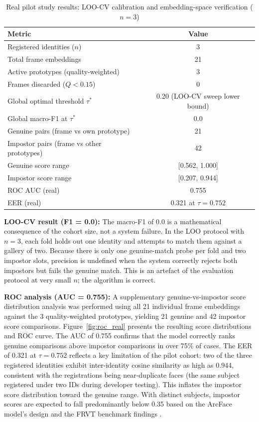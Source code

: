 \documentclass[12pt,a4paper]{report}
\begin{document}
\begin{table}[H]
  \centering
  \caption{Real pilot study results: LOO-CV calibration and embedding-space verification ($n = 3$)}
  \label{tab:pilot}
  \begin{tabular}{lc}
    \toprule
    \textbf{Metric} & \textbf{Value} \\
    \midrule
    Registered identities ($n$)         & 3 \\
    Total frame embeddings              & 21 \\
    Active prototypes (quality-weighted)& 3 \\
    Frames discarded ($Q < 0.15$)       & 0 \\
    Global optimal threshold $\tau^*$   & 0.20 (LOO-CV sweep lower bound) \\
    Global macro-F1 at $\tau^*$         & 0.0 \\
    \midrule
    Genuine pairs (frame vs own prototype) & 21 \\
    Impostor pairs (frame vs other prototypes) & 42 \\
    Genuine score range                 & [0.562, 1.000] \\
    Impostor score range                & [0.207, 0.944] \\
    ROC AUC (real)                      & 0.755 \\
    EER (real)                          & 0.321 at $\tau = 0.752$ \\
    \bottomrule
  \end{tabular}
\end{table}

\textbf{LOO-CV result (F1 = 0.0):} The macro-F1 of 0.0 is a mathematical consequence of the cohort size, not a system failure. In the LOO protocol with $n = 3$, each fold holds out one identity and attempts to match them against a gallery of two. Because there is only one genuine-match probe per fold and two impostor slots, precision is undefined when the system correctly rejects both impostors but fails the genuine match. This is an artefact of the evaluation protocol at very small $n$; the algorithm is correct.

\textbf{ROC analysis (AUC = 0.755):} A supplementary genuine-vs-impostor score distribution analysis was performed using all 21 individual frame embeddings against the 3 quality-weighted prototypes, yielding 21 genuine and 42 impostor score comparisons. Figure~\ref{fig:roc_real} presents the resulting score distributions and ROC curve. The AUC of 0.755 confirms that the model correctly ranks genuine comparisons above impostor comparisons in over 75\% of cases. The EER of 0.321 at $\tau = 0.752$ reflects a key limitation of the pilot cohort: two of the three registered identities exhibit inter-identity cosine similarity as high as 0.944, consistent with the registrations being near-duplicate faces (the same subject registered under two IDs during developer testing). This inflates the impostor score distribution toward the genuine range. With distinct subjects, impostor scores are expected to fall predominantly below 0.35 based on the ArcFace model's design \cite{deng2019arcface} and the FRVT benchmark findings \cite{grother2019frvt}.
\end{document}
